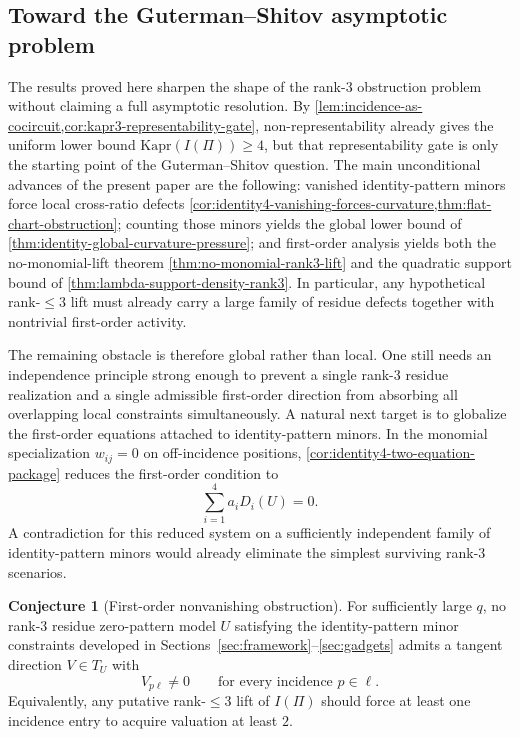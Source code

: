 \documentclass[11pt]{amsart}
\numberwithin{equation}{section}
\theoremstyle{plain}
\theoremstyle{definition}
\newtheorem{conjecture}[theorem]{Conjecture}
\theoremstyle{remark}
\newcommand{\Kapr}{\mathrm{Kapr}}
\begin{document}

\subsection{Toward the Guterman--Shitov asymptotic problem}
The results proved here sharpen the shape of the rank-$3$ obstruction problem without claiming a full asymptotic resolution. By \cref{lem:incidence-as-cocircuit,cor:kapr3-representability-gate}, non-representability already gives the uniform lower bound $\Kapr(I(\Pi))\ge 4$, but that representability gate is only the starting point of the Guterman--Shitov question. The main unconditional advances of the present paper are the following: vanished identity-pattern minors force local cross-ratio defects \cref{cor:identity4-vanishing-forces-curvature,thm:flat-chart-obstruction}; counting those minors yields the global lower bound of \cref{thm:identity-global-curvature-pressure}; and first-order analysis yields both the no-monomial-lift theorem \cref{thm:no-monomial-rank3-lift} and the quadratic support bound of \cref{thm:lambda-support-density-rank3}. In particular, any hypothetical rank-$\le 3$ lift must already carry a large family of residue defects together with nontrivial first-order activity.

The remaining obstacle is therefore global rather than local. One still needs an independence principle strong enough to prevent a single rank-$3$ residue realization and a single admissible first-order direction from absorbing all overlapping local constraints simultaneously. A natural next target is to globalize the first-order equations attached to identity-pattern minors. In the monomial specialization $w_{ij}=0$ on off-incidence positions, \cref{cor:identity4-two-equation-package} reduces the first-order condition to
\[
\sum_{i=1}^4 a_i D_i(U)=0.
\]
A contradiction for this reduced system on a sufficiently independent family of identity-pattern minors would already eliminate the simplest surviving rank-$3$ scenarios.

\begin{conjecture}[First-order nonvanishing obstruction]
\label{conj:first-order-nonvanishing-obstruction}
For sufficiently large $q$, no rank-$3$ residue zero-pattern model $U$ satisfying the identity-pattern minor constraints developed in Sections~\ref{sec:framework}--\ref{sec:gadgets} admits a tangent direction $V\in T_U$ with
\[
V_{p\ell}\neq 0
\qquad\text{for every incidence }p\in\ell.
\]
Equivalently, any putative rank-$\le 3$ lift of $I(\Pi)$ should force at least one incidence entry to acquire valuation at least $2$.
\end{conjecture}
\end{document}
